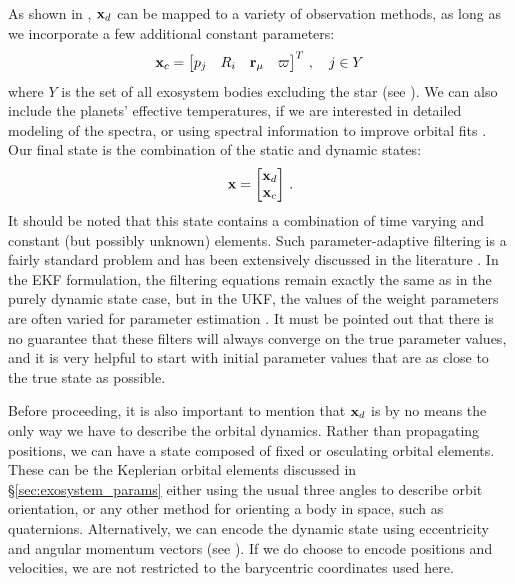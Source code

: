 As shown in , $\mathbf x_d$ can be mapped to a variety of observation methods, as long as we incorporate a few additional constant parameters:
\begin{equation}
\mathbf x_c = \begin{bmatrix} p_j & R_i & \mathbf r_\mu& \varpi \end{bmatrix}^T\,, \quad j \in Y
\end{equation}
where $Y$ is the set of all exosystem bodies excluding the star (see ).  We can also include the planets' effective temperatures, if we are interested in detailed modeling of the spectra, or using spectral information to improve orbital fits \citep{barman2001irradiated, hauschildt2008irradiated, burrows2003beyond}.  Our final state is the combination of the static and dynamic states:
\begin{equation}\label{eq:stateVector}
\mathbf x = \begin{bmatrix} \mathbf x_d \\ \mathbf x_c \end{bmatrix} \,.
\end{equation}
It should be noted that this state contains a combination of time varying and constant (but possibly unknown) elements.  Such parameter-adaptive filtering is a fairly standard problem and has been extensively discussed in the literature \citep{stengel1994optimal,crassidis2004,gustafsson2000adaptive,mehra1972approaches,rutan1991adaptive}.  In the EKF formulation, the filtering equations remain exactly the same as in the purely dynamic state case, but in the UKF, the values of the weight parameters are often varied for parameter estimation \citep{julier2004unscented}.  It must be pointed out that there is no guarantee that these filters will always converge on the true parameter values, and it is very helpful to start with initial parameter values that are as close to the true state as possible.

Before proceeding, it is also important to mention that $\mathbf x_d$ is by no means the only way we have to describe the orbital dynamics.  Rather than propagating positions, we can have a state composed of fixed or osculating orbital elements.  These can be the Keplerian orbital elements discussed in \S\ref{sec:exosystem_params} either using the usual three angles to describe orbit orientation, or any other method for orienting a body in space, such as quaternions. Alternatively, we can encode the dynamic state using eccentricity and angular momentum vectors (see ).  If we do choose to encode positions and velocities, we are not restricted to the barycentric coordinates used here.  

